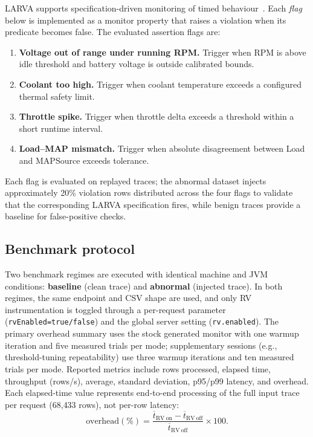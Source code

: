 LARVA supports specification-driven monitoring of timed behaviour~\cite{colombo2009larva}. Each \emph{flag} below is implemented as a monitor property that raises a violation when its predicate becomes false. The evaluated assertion flags are:

\begin{enumerate}
    \item \textbf{Voltage out of range under running RPM.} Trigger when RPM is above idle threshold and battery voltage is outside calibrated bounds.
    \item \textbf{Coolant too high.} Trigger when coolant temperature exceeds a configured thermal safety limit.
    \item \textbf{Throttle spike.} Trigger when throttle delta exceeds a threshold within a short runtime interval.
    \item \textbf{Load--MAP mismatch.} Trigger when absolute disagreement between Load and MAPSource exceeds tolerance.
\end{enumerate}

Each flag is evaluated on replayed traces; the abnormal dataset injects approximately 20\% violation rows distributed across the four flags to validate that the corresponding LARVA specification fires, while benign traces provide a baseline for false-positive checks.

\subsection{Benchmark protocol}

Two benchmark regimes are executed with identical machine and JVM conditions: \textbf{baseline} (clean trace) and \textbf{abnormal} (injected trace). In both regimes, the same endpoint and CSV shape are used, and only RV instrumentation is toggled through a per-request parameter (\texttt{rvEnabled=true/false}) and the global server setting (\texttt{rv.enabled}). The primary overhead summary uses the stock generated monitor with one warmup iteration and five measured trials per mode; supplementary sessions (e.g., threshold-tuning repeatability) use three warmup iterations and ten measured trials per mode. Reported metrics include rows processed, elapsed time, throughput (rows/s), average, standard deviation, p95/p99 latency, and overhead. Each elapsed-time value represents end-to-end processing of the full input trace per request (68{,}433 rows), not per-row latency:
\[
\text{overhead}(\%)=\frac{\overline{t}_{\mathrm{RV\ on}}-\overline{t}_{\mathrm{RV\ off}}}{\overline{t}_{\mathrm{RV\ off}}}\times 100.
\]

